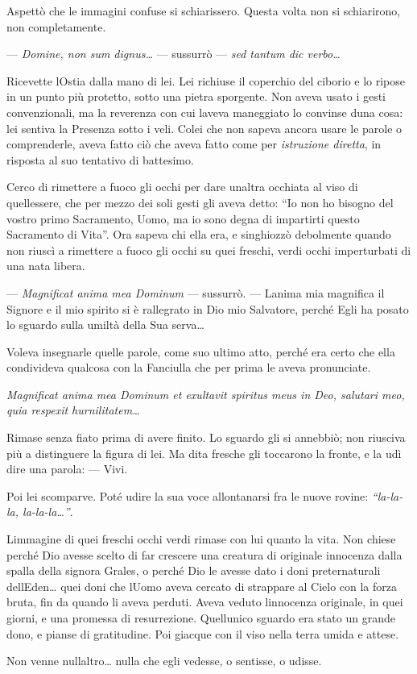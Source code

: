 Aspettò che le immagini confuse si schiarissero. Questa volta non si
schiarirono, non completamente.

--- \emph{Domine, non sum dignus\ldots{}} --- sussurrò --- \emph{sed
	tantum dic verbo\ldots{}}

Ricevette l\textquotesingle Ostia dalla mano di lei. Lei richiuse il
coperchio del ciborio e lo ripose in un punto più protetto, sotto una
pietra sporgente. Non aveva usato i gesti convenzionali, ma la reverenza
con cui l\textquotesingle aveva maneggiato lo convinse
d\textquotesingle una cosa: lei sentiva la Presenza sotto i veli. Colei
che non sapeva ancora usare le parole o comprenderle, aveva fatto ciò
che aveva fatto come per \emph{istruzione diretta}, in risposta al suo
tentativo di battesimo.

Cerco di rimettere a fuoco gli occhi per dare un\textquotesingle altra
occhiata al viso di quell\textquotesingle essere, che per mezzo dei soli
gesti gli aveva detto: ``Io non ho bisogno del vostro primo Sacramento,
Uomo, ma io sono degna di impartirti questo Sacramento di Vita''. Ora
sapeva chi ella era, e singhiozzò debolmente quando non riuscì a
rimettere a fuoco gli occhi su quei freschi, verdi occhi imperturbati di
una nata libera.

--- \emph{Magnificat anima mea Dominum} --- sussurrò. ---
L\textquotesingle anima mia magnifica il Signore e il mio spirito si è
rallegrato in Dio mio Salvatore, perché Egli ha posato lo sguardo sulla
umiltà della Sua serva\ldots{}

Voleva insegnarle quelle parole, come suo ultimo atto, perché era certo
che ella condivideva qualcosa con la Fanciulla che per prima le aveva
pronunciate.

\emph{Magnificat anima mea Dominum et exultavit spiritus meus in Deo,
	salutari meo, quia respexit hurnilitatem\ldots{}}

Rimase senza fiato prima di avere finito. Lo sguardo gli si annebbiò;
non riusciva più a distinguere la figura di lei. Ma dita fresche gli
toccarono la fronte, e la udì dire una parola: --- Vivi.

Poi lei scomparve. Poté udire la sua voce allontanarsi fra le nuove
rovine: \emph{``la-la-la, la-la-la\ldots''}.

L\textquotesingle immagine di quei freschi occhi verdi rimase con lui
quanto la vita. Non chiese perché Dio avesse scelto di far crescere una
creatura di originale innocenza dalla spalla della signora Grales, o
perché Dio le avesse dato i doni preternaturali
dell\textquotesingle Eden\ldots{} quei doni che l\textquotesingle Uomo
aveva cercato di strappare al Cielo con la forza bruta, fin da quando li
aveva perduti. Aveva veduto l\textquotesingle innocenza originale, in
quei giorni, e una promessa di resurrezione. Quell\textquotesingle unico
sguardo era stato un grande dono, e pianse di gratitudine. Poi giacque
con il viso nella terra umida e attese.

Non venne null\textquotesingle altro\ldots{} nulla che egli vedesse, o
sentisse, o udisse.
